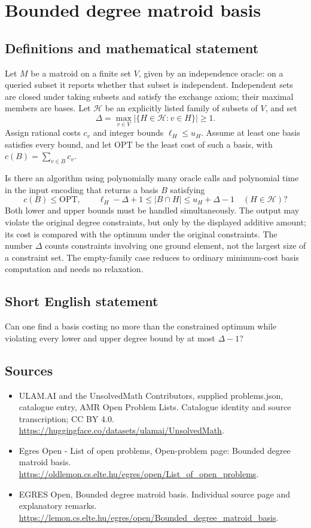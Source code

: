 \documentclass[11pt,a4paper]{article}
\begin{document}
\section*{Bounded degree matroid basis}\label{statement}

\subsection{Definitions and mathematical statement}
Let $M$ be a matroid on a finite set $V$, given by an independence oracle:
on a queried subset it reports whether that subset is independent.
Independent sets are closed under taking subsets and satisfy the exchange
axiom; their maximal members are bases. Let $\mathcal H$ be an explicitly
listed family of subsets of $V$, and set
\[
       \Delta=\max_{v\in V}|\{H\in\mathcal H:v\in H\}|\ge1.
\]
Assign rational costs $c_v$ and integer bounds $\ell_H\le u_H$.
Assume at least one basis satisfies every bound, and let $\mathrm{OPT}$
be the least cost of such a basis, with $c(B)=\sum_{v\in B}c_v$.

Is there an algorithm using polynomially many oracle calls and polynomial
time in the input encoding that returns a basis $B$ satisfying
\[
 c(B)\le\mathrm{OPT},\qquad
 \ell_H-\Delta+1\le |B\cap H|\le u_H+\Delta-1
                       \quad(H\in\mathcal H)?
\]
Both lower and upper bounds must be handled simultaneously. The output
may violate the original degree constraints, but only by the displayed
additive amount; its cost is compared with the optimum under the original
constraints. The number $\Delta$ counts constraints involving one ground
element, not the largest size of a constraint set. The empty-family case
reduces to ordinary minimum-cost basis computation and needs no relaxation.
\subsection{Short English statement}
Can one find a basis costing no more than the constrained optimum
while violating every lower and upper degree bound by at most $\Delta-1$?
\subsection{Sources}
\begin{itemize}
\item[S1] ULAM.AI and the UnsolvedMath Contributors, supplied problems.json, catalogue entry, AMR Open Problem Lists. Catalogue identity and source transcription; CC BY 4.0.
\url{https://huggingface.co/datasets/ulamai/UnsolvedMath}.
\item[S2] Egres Open - List of open problems, Open-problem page: Bounded degree matroid basis. 
\url{https://oldlemon.cs.elte.hu/egres/open/List_of_open_problems}.
\item[S3] EGRES Open, Bounded degree matroid basis. Individual source page and explanatory remarks.
\url{https://lemon.cs.elte.hu/egres/open/Bounded_degree_matroid_basis}.
\end{itemize}
\end{document}
